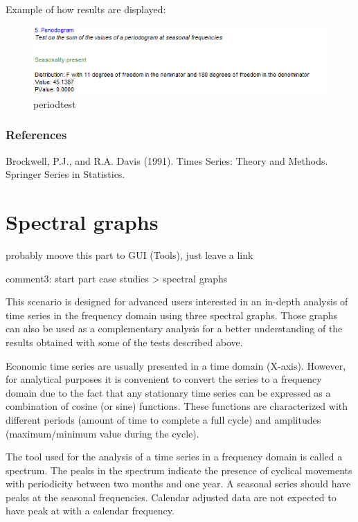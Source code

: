 \documentclass[
  letterpaper,
  DIV=11,
  numbers=noendperiod]{scrreprt}
\begin{document}
Example of how results are displayed:

\begin{figure}

{\centering \includegraphics{./All_images/periodogram.png}

}

\caption{periodtest}

\end{figure}

\hypertarget{references-3}{%
\subsubsection{References}\label{references-3}}

Brockwell, P.J., and R.A. Davis (1991). Times Series: Theory and
Methods. Springer Series in Statistics.

\hypertarget{spectral-graphs}{%
\section{Spectral graphs}\label{spectral-graphs}}

probably moove this part to GUI (Tools), just leave a link

comment3: start part case studies \textgreater{} spectral graphs

This scenario is designed for advanced users interested in an in-depth
analysis of time series in the frequency domain using three spectral
graphs. Those graphs can also be used as a complementary analysis for a
better understanding of the results obtained with some of the tests
described above.

Economic time series are usually presented in a time domain (X-axis).
However, for analytical purposes it is convenient to convert the series
to a frequency domain due to the fact that any stationary time series
can be expressed as a combination of cosine (or sine) functions. These
functions are characterized with different periods (amount of time to
complete a full cycle) and amplitudes (maximum/minimum value during the
cycle).

The tool used for the analysis of a time series in a frequency domain is
called a spectrum. The peaks in the spectrum indicate the presence of
cyclical movements with periodicity between two months and one year. A
seasonal series should have peaks at the seasonal frequencies. Calendar
adjusted data are not expected to have peak at with a calendar
frequency.
\end{document}
